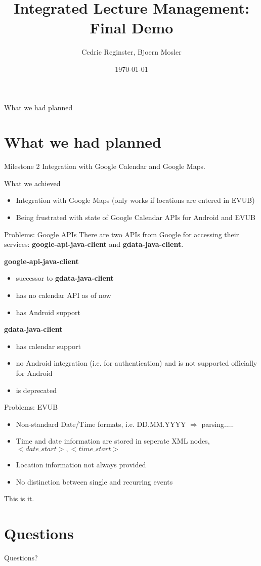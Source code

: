 \documentclass{beamer}
\title[Integrated Lecture Management]{Integrated Lecture Management: Final Demo}
\date{\today}
\institute{IAM}
\author{Cedric Reginster, Bjoern Mosler}
\begin{document}
\begin{frame}
	\titlepage
\end{frame}


\begin{frame}{What we had planned}
	\section{What we had planned}
\bigskip 

	\begin{block}{Milestone 2}
	Integration with Google Calendar and Google Maps.
	\end{block}
\end{frame}

\begin{frame}{What we achieved}
	\begin{itemize}
		\item Integration with Google Maps (only works if locations are entered in EVUB)
		\item Being frustrated with state of Google Calendar APIs for Android and EVUB
	\end{itemize}
\end{frame}

\begin{frame}{Problems: Google APIs}
	There are two APIs from Google for accessing their services: \textbf{google-api-java-client} and 			\textbf{gdata-java-client}.
		\\
	\bigskip

	\textbf{google-api-java-client}
	\begin{itemize}
		\item successor to \textbf{gdata-java-client}
		\item has no calendar API as of now
		\item has Android support
	\end{itemize}
		\bigskip
	\textbf{gdata-java-client}
	\begin{itemize}
		\item has calendar support
		\item no Android integration (i.e. for authentication) and is not supported officially for Android
		\item is deprecated
	\end{itemize}
	
\end{frame}

\begin{frame}{Problems: EVUB}
	\begin{itemize}
		\item Non-standard Date/Time formats, i.e. DD.MM.YYYY $\Rightarrow$ parsing.....
		\item Time and date information are stored in seperate XML nodes, $<date\_start>, <time\_start>$
		\item Location information not always provided
		\item No distinction between single and recurring events
	\end{itemize}
\end{frame}
	
\begin{frame}{This is it.}
\section{Questions}
Questions?
\end{frame}
\end{document}
